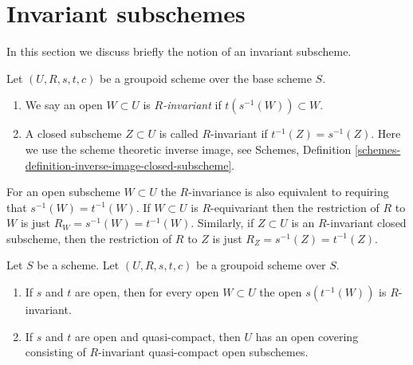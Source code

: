 \section{Invariant subschemes}
\label{section-invariant}

\noindent
In this section we discuss briefly the notion of an invariant subscheme.

\begin{definition}
\label{definition-invariant-open}
Let $(U, R, s, t, c)$ be a groupoid scheme over the base scheme $S$.
\begin{enumerate}
\item We say an open $W \subset U$ is {\it $R$-invariant} if
$t(s^{-1}(W)) \subset W$.
\item A closed subscheme $Z \subset U$ is called $R$-invariant
if $t^{-1}(Z) = s^{-1}(Z)$. Here we use the scheme theoretic inverse image, see
Schemes, Definition \ref{schemes-definition-inverse-image-closed-subscheme}.
\end{enumerate}
\end{definition}

\noindent
For an open subscheme $W \subset U$ the $R$-invariance
is also equivalent to requiring that $s^{-1}(W) = t^{-1}(W)$.
If $W \subset U$ is $R$-equivariant then the restriction of $R$ to
$W$ is just $R_W = s^{-1}(W) = t^{-1}(W)$. Similarly, if $Z \subset U$
is an $R$-invariant closed subscheme, then the restriction of $R$
to $Z$ is just $R_Z = s^{-1}(Z) = t^{-1}(Z)$.

\begin{lemma}
\label{lemma-constructing-invariant-opens}
Let $S$ be a scheme.
Let $(U, R, s, t, c)$ be a groupoid scheme over $S$.
\begin{enumerate}
\item If $s$ and $t$ are open, then for every open $W \subset U$
the open $s(t^{-1}(W))$ is $R$-invariant.
\item If $s$ and $t$ are open and quasi-compact, then $U$ has an open
covering consisting of $R$-invariant quasi-compact open subschemes.
\end{enumerate}
\end{lemma}

